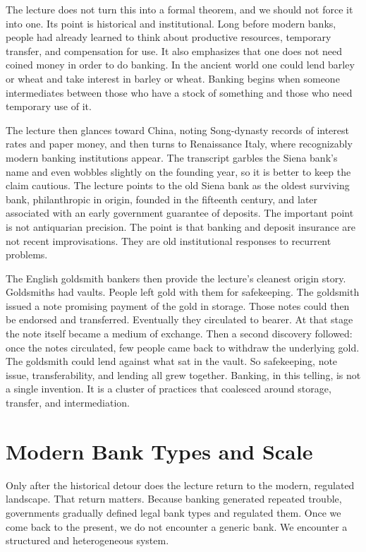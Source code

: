 The lecture does not turn this into a formal theorem, and we should not force it into one. Its point is historical and institutional. Long before modern banks, people had already learned to think about productive resources, temporary transfer, and compensation for use. It also emphasizes that one does not need coined money in order to do banking. In the ancient world one could lend barley or wheat and take interest in barley or wheat. Banking begins when someone intermediates between those who have a stock of something and those who need temporary use of it.

The lecture then glances toward China, noting Song-dynasty records of interest rates and paper money, and then turns to Renaissance Italy, where recognizably modern banking institutions appear. The transcript garbles the Siena bank's name and even wobbles slightly on the founding year, so it is better to keep the claim cautious. The lecture points to the old Siena bank as the oldest surviving bank, philanthropic in origin, founded in the fifteenth century, and later associated with an early government guarantee of deposits. The important point is not antiquarian precision. The point is that banking and deposit insurance are not recent improvisations. They are old institutional responses to recurrent problems.

The English goldsmith bankers then provide the lecture's cleanest origin story. Goldsmiths had vaults. People left gold with them for safekeeping. The goldsmith issued a note promising payment of the gold in storage. Those notes could then be endorsed and transferred. Eventually they circulated to bearer. At that stage the note itself became a medium of exchange. Then a second discovery followed: once the notes circulated, few people came back to withdraw the underlying gold. The goldsmith could lend against what sat in the vault. So safekeeping, note issue, transferability, and lending all grew together. Banking, in this telling, is not a single invention. It is a cluster of practices that coalesced around storage, transfer, and intermediation.

\section{Modern Bank Types and Scale}

Only after the historical detour does the lecture return to the modern, regulated landscape. That return matters. Because banking generated repeated trouble, governments gradually defined legal bank types and regulated them. Once we come back to the present, we do not encounter a generic bank. We encounter a structured and heterogeneous system.

